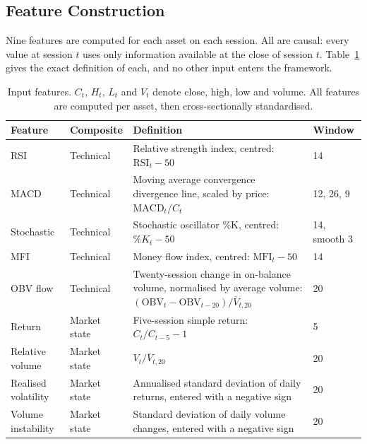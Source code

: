 \subsection{Feature Construction}

Nine features are computed for each asset on each session. All are causal: every value
at session $t$ uses only information available at the close of session $t$. Table~\ref{tab:features}
gives the exact definition of each, and no other input enters the framework.

\begin{table}[!ht]
\centering
\caption{Input features. $C_t$, $H_t$, $L_t$ and $V_t$ denote close, high, low and
volume. All features are computed per asset, then cross-sectionally standardised.}
\label{tab:features}
\small
\begin{tabular}{p{2.0cm}p{1.8cm}p{5.2cm}p{1.5cm}}
\hline
\textbf{Feature} & \textbf{Composite} & \textbf{Definition} & \textbf{Window} \\
\hline
RSI & Technical & Relative strength index, centred: $\mathrm{RSI}_t - 50$ & 14 \\
\hline
MACD & Technical & Moving average convergence divergence line, scaled by price: $\mathrm{MACD}_t / C_t$ & 12, 26, 9 \\
\hline
Stochastic & Technical & Stochastic oscillator \%K, centred: $\%K_t - 50$ & 14, smooth 3 \\
\hline
MFI & Technical & Money flow index, centred: $\mathrm{MFI}_t - 50$ & 14 \\
\hline
OBV flow & Technical & Twenty-session change in on-balance volume, normalised by average volume: $(\mathrm{OBV}_t - \mathrm{OBV}_{t-20}) / \overline{V}_{t,20}$ & 20 \\
\hline
Return & Market state & Five-session simple return: $C_t / C_{t-5} - 1$ & 5 \\
\hline
Relative volume & Market state & $V_t / \overline{V}_{t,20}$ & 20 \\
\hline
Realised volatility & Market state & Annualised standard deviation of daily returns, entered with a negative sign & 20 \\
\hline
Volume instability & Market state & Standard deviation of daily volume changes, entered with a negative sign & 20 \\
\hline
\end{tabular}
\end{table}

